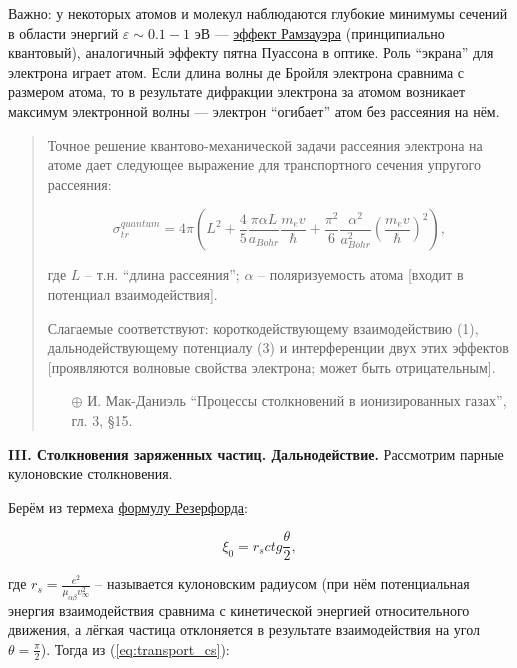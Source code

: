\documentclass[10pt, a4paper]{article}
\numberwithin{equation}{section}
\begin{document}
Важно: у некоторых атомов и молекул наблюдаются глубокие минимумы сечений в области энергий $\varepsilon \sim 0.1-1$ эВ --- \uline{эффект Рамзауэра} \cite{raizer} (принципиально квантовый), аналогичный эффекту пятна Пуассона в оптике. Роль ``экрана'' для электрона играет атом. Если длина волны де Бройля электрона сравнима с размером атома, то в результате дифракции электрона за атомом возникает максимум электронной волны — электрон ``огибает'' атом без рассеяния на нём.

\begin{quotation}
	
	Точное решение квантово-механической задачи рассеяния электрона на атоме дает следующее выражение для транспортного сечения упругого рассеяния:
	
	\begin{equation*}
		\sigma_{tr}^{quantum} = 4\pi \left(L^{2}+\frac{4}{5}\frac{\pi \alpha L}{a_{Bohr}}\frac{m_ev}{\hbar}+\frac{\pi^{2}}{6}\frac{\alpha^{2}}{a_{Bohr}^{2}}\left( \frac{m_ev}{\hbar}\right) ^{2} \right), 
	\end{equation*}
	
	где $L$ -- т.н. ``длина рассеяния''; $\alpha$ -- поляризуемость атома [входит в потенциал взаимодействия].
	
	Слагаемые соответствуют: короткодействующему взаимодействию (1), дальнодействующему потенциалу (3) и интерференции двух этих эффектов [проявляются волновые свойства электрона; может быть отрицательным].
	
	\begin{itemize}
		\item[$\oplus$] И. Мак-Даниэль ``Процессы столкновений в ионизированных газах'', гл. 3, \S 15.
	\end{itemize}
	
\end{quotation}

{\bfseries \large III. Столкновения заряженных частиц. Дальнодействие.} Рассмотрим парные кулоновские столкновения.

Берём из термеха \uline{формулу Резерфорда}:

\begin{equation} \label{eq:Rutherford}
	\xi_0 = r_s ctg\frac{\theta}{2},
\end{equation}

где $r_s = \frac{e^2}{\mu_{\alpha\beta}v_\infty^2}$ -- называется кулоновским радиусом (при нём потенциальная энергия взаимодействия сравнима с кинетической энергией относительного движения, а лёгкая частица отклоняется в результате взаимодействия на угол $\theta=\frac{\pi}{2}$\cite{raizer}). Тогда из (\ref{eq:transport_cs}):
\end{document}
